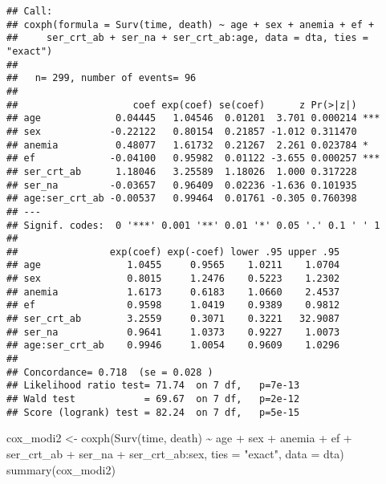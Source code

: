 \documentclass[
]{article}
\newenvironment{Shaded}{\begin{snugshade}}{\end{snugshade}}
\newcommand{\AttributeTok}[1]{\textcolor[rgb]{0.77,0.63,0.00}{#1}}
\newcommand{\FunctionTok}[1]{\textcolor[rgb]{0.00,0.00,0.00}{#1}}
\newcommand{\NormalTok}[1]{#1}
\newcommand{\OtherTok}[1]{\textcolor[rgb]{0.56,0.35,0.01}{#1}}
\newcommand{\SpecialCharTok}[1]{\textcolor[rgb]{0.00,0.00,0.00}{#1}}
\newcommand{\StringTok}[1]{\textcolor[rgb]{0.31,0.60,0.02}{#1}}
\begin{document}
\begin{verbatim}
## Call:
## coxph(formula = Surv(time, death) ~ age + sex + anemia + ef + 
##     ser_crt_ab + ser_na + ser_crt_ab:age, data = dta, ties = "exact")
## 
##   n= 299, number of events= 96 
## 
##                    coef exp(coef) se(coef)      z Pr(>|z|)    
## age             0.04445   1.04546  0.01201  3.701 0.000214 ***
## sex            -0.22122   0.80154  0.21857 -1.012 0.311470    
## anemia          0.48077   1.61732  0.21267  2.261 0.023784 *  
## ef             -0.04100   0.95982  0.01122 -3.655 0.000257 ***
## ser_crt_ab      1.18046   3.25589  1.18026  1.000 0.317228    
## ser_na         -0.03657   0.96409  0.02236 -1.636 0.101935    
## age:ser_crt_ab -0.00537   0.99464  0.01761 -0.305 0.760398    
## ---
## Signif. codes:  0 '***' 0.001 '**' 0.01 '*' 0.05 '.' 0.1 ' ' 1
## 
##                exp(coef) exp(-coef) lower .95 upper .95
## age               1.0455     0.9565    1.0211    1.0704
## sex               0.8015     1.2476    0.5223    1.2302
## anemia            1.6173     0.6183    1.0660    2.4537
## ef                0.9598     1.0419    0.9389    0.9812
## ser_crt_ab        3.2559     0.3071    0.3221   32.9087
## ser_na            0.9641     1.0373    0.9227    1.0073
## age:ser_crt_ab    0.9946     1.0054    0.9609    1.0296
## 
## Concordance= 0.718  (se = 0.028 )
## Likelihood ratio test= 71.74  on 7 df,   p=7e-13
## Wald test            = 69.67  on 7 df,   p=2e-12
## Score (logrank) test = 82.24  on 7 df,   p=5e-15
\end{verbatim}

\begin{Shaded}
\begin{Highlighting}[]
\NormalTok{cox\_modi2 }\OtherTok{\textless{}{-}} \FunctionTok{coxph}\NormalTok{(}\FunctionTok{Surv}\NormalTok{(time, death) }\SpecialCharTok{\textasciitilde{}}\NormalTok{ age  }\SpecialCharTok{+}\NormalTok{ sex }\SpecialCharTok{+}\NormalTok{ anemia }\SpecialCharTok{+}\NormalTok{ ef }\SpecialCharTok{+}\NormalTok{ ser\_crt\_ab }\SpecialCharTok{+}\NormalTok{ ser\_na }\SpecialCharTok{+}\NormalTok{ ser\_crt\_ab}\SpecialCharTok{:}\NormalTok{sex, }\AttributeTok{ties =} \StringTok{"exact"}\NormalTok{, }\AttributeTok{data =}\NormalTok{ dta)}
\FunctionTok{summary}\NormalTok{(cox\_modi2)}
\end{Highlighting}
\end{Shaded}
\end{document}
